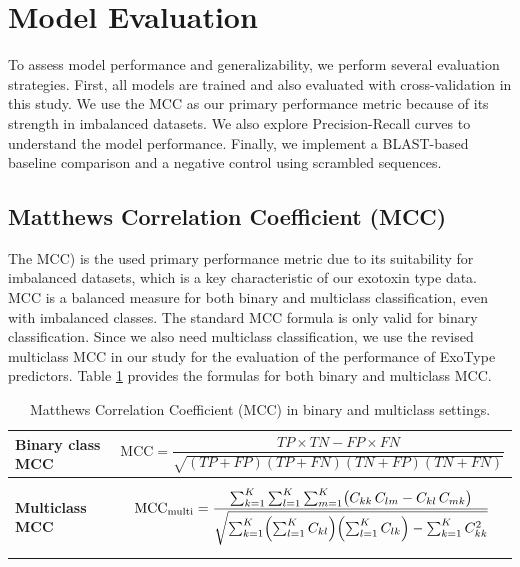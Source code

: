 \section{Model Evaluation}
\label{section:model_evaluation}

To assess model performance and generalizability, we perform several evaluation strategies.
First, all models are trained and also evaluated with cross-validation in this study.
We use the \gls{MCC} \cite{matthews1975comparison} as our primary performance metric because of its strength in imbalanced datasets.
We also explore Precision-Recall curves to understand the model performance.
Finally, we implement a \gls{BLAST}-based baseline comparison and a negative control using scrambled sequences.

\subsection{Matthews Correlation Coefficient (MCC)}

The  \gls{MCC}) \cite{chicco2020advantages} is the used primary performance metric due to its suitability for imbalanced datasets, which is a key characteristic of our exotoxin type data.
\gls{MCC} is a balanced measure for both binary and multiclass classification, even with imbalanced classes.
The standard \gls{MCC} formula is only valid for binary classification.
Since we also need multiclass classification, we use the revised multiclass \gls{MCC} in our study for the evaluation of the performance of ExoType predictors.
Table \ref{tab:mcc} provides the formulas for both binary and multiclass \gls{MCC}.

\begin{table}[h!]
	\centering
	\small
	\begin{tabular}{|l|p{10cm}|}
		\hline
		\textbf{Binary class MCC} &
		\[
		\text{MCC} =
		\frac{TP \times TN - FP \times FN}
		{\sqrt{(TP + FP)(TP + FN)(TN + FP)(TN + FN)}}
		\]
		\\
		\hline
		\textbf{Multiclass MCC} &
		\[
		\text{MCC}_{\text{multi}} =
		\frac{
			\sum_{k=1}^{K}\sum_{l=1}^{K}\sum_{m=1}^{K}
			\bigl(C_{kk}\,C_{lm} - C_{kl}\,C_{mk}\bigr)
		}{
			\sqrt{
				\sum_{k=1}^{K}
				\Bigl(\sum_{l=1}^{K} C_{kl}\Bigr)
				\Bigl(\sum_{l=1}^{K} C_{lk}\Bigr)
				- \sum_{k=1}^{K} C_{kk}^{2}
			}
		}
		\]
		\\
		\hline
	\end{tabular}
	\caption{Matthews Correlation Coefficient (MCC) in binary and multiclass settings.}
	\label{tab:mcc}
\end{table}


